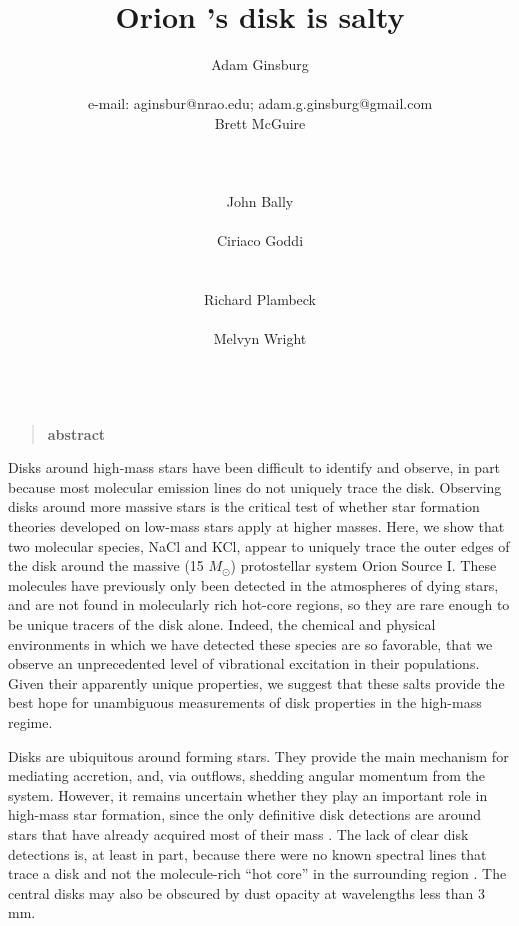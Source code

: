 \documentclass[12pt]{article}
\date{}
\author{
Adam Ginsburg\\
\nraojansky\\
e-mail: aginsbur@nrao.edu; adam.g.ginsburg@gmail.com\\
Brett McGuire\\
\hubble\\
\nraocv\\
\cfa\\
John Bally\\
\casa\\
Ciriaco Goddi\\
\allegro\\
\radboud\\
Richard Plambeck\\
\berkeley\\
Melvyn Wright\\
\berkeley\\
}
\title{Orion \sourcei's disk is salty}
\newenvironment{sciabstract}{%
\begin{quote} \bf  }
{\end{quote}}
\newcommand{\msun}{\ensuremath{M_{\odot}}\xspace}			%
\begin{document}


\maketitle

\begin{sciabstract}
    abstract
\end{sciabstract}




Disks around high-mass stars have been difficult to identify and observe, in
part because most molecular emission lines do not uniquely trace the disk.
Observing disks around more massive stars is the critical test of whether star
formation theories developed on low-mass stars apply at higher masses.  Here,
we show that two molecular species, NaCl and KCl, appear to uniquely trace the
outer edges of the disk around the massive (15 \msun) protostellar system Orion
Source I. These molecules have previously only been detected in the atmospheres
of dying stars, and are not found in molecularly rich hot-core regions, so they
are rare enough to be unique tracers of the disk alone.  Indeed, the chemical
and physical environments in which we have detected these species are so
favorable, that we observe an unprecedented level of vibrational excitation in
their populations.    Given their apparently unique properties, we suggest that
these salts provide the best hope for unambiguous measurements of disk
properties in the high-mass regime.

Disks are ubiquitous around forming stars.  They provide the main mechanism for
mediating accretion, and, via outflows, shedding angular momentum from the system.
However, it remains uncertain whether they play an important role in high-mass
star formation, since the only definitive disk detections are around stars that
have already acquired most of their mass \cite{Girart2017a,Ginsburg2018b}.
The lack of clear disk detections is, at least in part, because there were no
known spectral lines that trace a disk and not the molecule-rich ``hot core''
in the surrounding region \cite{Goddi2018a,Cesaroni2017a}.  The central disks
may also be obscured by dust opacity at wavelengths less than 3 mm.
\end{document}
